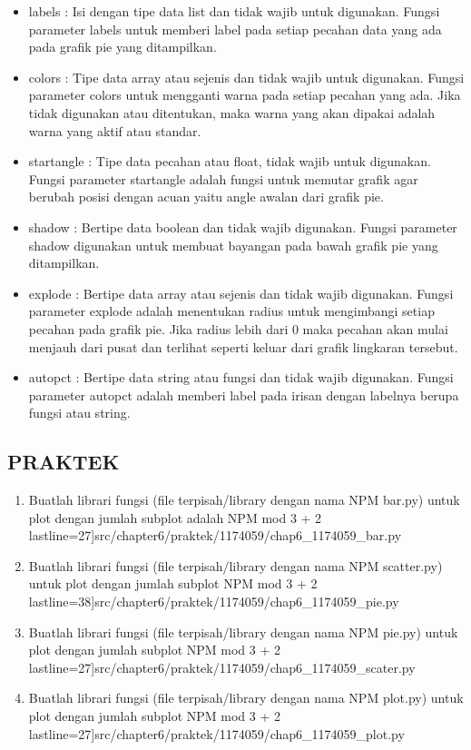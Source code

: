 \begin {enumerate}
\begin{itemize}
	\item labels : Isi dengan tipe data list dan tidak wajib untuk digunakan. Fungsi parameter labels untuk memberi label pada setiap pecahan data yang ada pada grafik pie yang ditampilkan.
	\item colors : Tipe data array atau sejenis dan tidak wajib untuk digunakan. Fungsi parameter colors untuk mengganti warna pada setiap pecahan yang ada. Jika tidak digunakan atau ditentukan, maka warna yang akan dipakai adalah warna yang aktif atau standar.
	\item startangle : Tipe data pecahan atau float, tidak wajib untuk digunakan. Fungsi parameter startangle adalah fungsi untuk memutar grafik agar berubah posisi dengan acuan yaitu angle awalan dari grafik pie.
	\item shadow : Bertipe data boolean dan tidak wajib digunakan. Fungsi parameter shadow digunakan untuk membuat bayangan pada bawah grafik pie yang ditampilkan. 
	\item explode : Bertipe data array atau sejenis dan tidak wajib digunakan. Fungsi parameter explode adalah menentukan radius untuk mengimbangi setiap pecahan pada grafik pie. Jika radius lebih dari 0 maka pecahan akan mulai menjauh dari pusat dan terlihat seperti keluar dari grafik lingkaran tersebut.
	\item autopct : Bertipe data string atau fungsi dan tidak wajib digunakan. Fungsi parameter autopct adalah memberi label pada irisan dengan labelnya berupa fungsi atau string. 
			\end{itemize}
	\end {enumerate}
	
		\subsection {PRAKTEK}
		\begin {enumerate}
			\item Buatlah librari fungsi (ﬁle terpisah/library dengan nama NPM bar.py) untuk plot dengan jumlah subplot adalah NPM mod 3 + 2
				 lastline=27]{src/chapter6/praktek/1174059/chap6_1174059_bar.py}
			\item Buatlah librari fungsi (ﬁle terpisah/library dengan nama NPM scatter.py) untuk plot dengan jumlah subplot NPM mod 3 + 2
				 lastline=38]{src/chapter6/praktek/1174059/chap6_1174059_pie.py}
			\item Buatlah librari fungsi (ﬁle terpisah/library dengan nama NPM pie.py) untuk plot dengan jumlah subplot NPM mod 3 + 2
				 lastline=27]{src/chapter6/praktek/1174059/chap6_1174059_scater.py}
			\item Buatlah librari fungsi (ﬁle terpisah/library dengan nama NPM plot.py) untuk plot dengan jumlah subplot NPM mod 3 + 2
				 lastline=27]{src/chapter6/praktek/1174059/chap6_1174059_plot.py}
		\end {enumerate}
		
